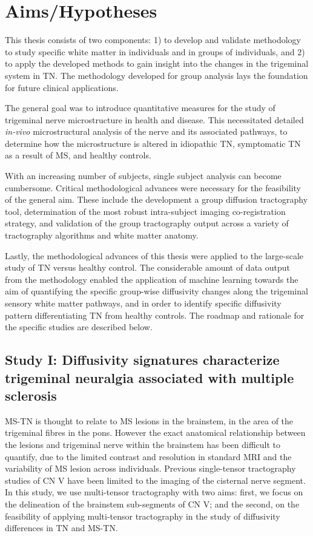 \chapter{Aims/Hypotheses}

This thesis consists of two components: 1) to develop and validate methodology to study specific white matter in individuals and in groups of individuals, and 2) to apply the developed methods to gain insight into the changes in the trigeminal system in TN. The methodology developed for group analysis lays the foundation for future clinical applications. 

The general goal was to introduce quantitative measures for the study of trigeminal nerve microstructure in health and disease. This necessitated detailed \textit{in-vivo} microstructural analysis of the nerve and its associated pathways, to determine how the microstructure is altered in idiopathic TN, symptomatic TN as a result of MS, and healthy controls. 

With an increasing number of subjects, single subject analysis can become cumbersome. Critical methodological advances were necessary for the feasibility of the general aim. These include the development a group diffusion tractography tool, determination of the most robust intra-subject imaging co-registration strategy, and validation of the group tractography output across a variety of tractography algorithms and white matter anatomy. 

Lastly, the methodological advances of this thesis were applied to the large-scale study of TN versus healthy control.  The considerable amount of data output from the methodology  enabled the application of machine learning towards the aim of quantifying the specific group-wise diffusivity changes along the trigeminal sensory white matter pathways, and in order to identify specific diffusivity pattern differentiating TN from healthy controls. The roadmap and rationale for the specific studies are described below.

\section[Study I]{Study I: Diffusivity signatures characterize trigeminal neuralgia associated with multiple sclerosis}
MS-TN is thought to relate to MS lesions in the brainstem, in the area of the trigeminal fibres in the pons. However the exact anatomical relationship between the lesions and trigeminal nerve within the brainstem has been difficult to quantify, due to the limited contrast and resolution in standard MRI and the variability of MS lesion across individuals. Previous single-tensor tractography studies of CN V have been limited to the imaging of the cisternal nerve segment. In this study, we use multi-tensor tractography with two aims: first, we focus on the delineation of the brainstem sub-segments of CN V; and the second, on the feasibility of applying multi-tensor tractography in the study of diffusivity differences in TN and MS-TN. 

